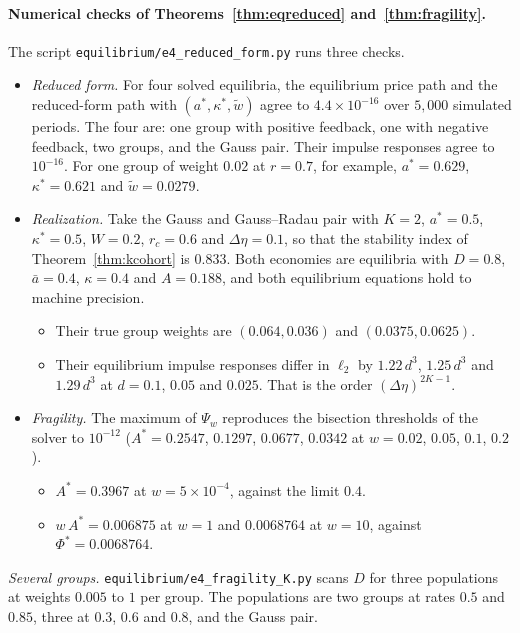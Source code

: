 \documentclass[12pt]{article}
\theoremstyle{definition}
\theoremstyle{remark}
\begin{document}
\paragraph{Numerical checks of Theorems~\ref{thm:eqreduced} and~\ref{thm:fragility}.} The script \nolinkurl{equilibrium/e4_reduced_form.py} runs three checks.
\begin{itemize}[itemsep=1pt,topsep=2pt]
\item \emph{Reduced form.} For four solved equilibria, the equilibrium price path and the reduced-form path with $(a^*,\kappa^*,\tilde w)$ agree to $4.4\times10^{-16}$ over $5{,}000$ simulated periods. The four are: one group with positive feedback, one with negative feedback, two groups, and the Gauss pair. Their impulse responses agree to $10^{-16}$. For one group of weight $0.02$ at $r=0.7$, for example, $a^*=0.629$, $\kappa^*=0.621$ and $\tilde w=0.0279$.
\item \emph{Realization.} Take the Gauss and Gauss--Radau pair with $K=2$, $a^*=0.5$, $\kappa^*=0.5$, $W=0.2$, $r_c=0.6$ and $\Delta\eta=0.1$, so that the stability index of Theorem~\ref{thm:kcohort} is $0.833$. Both economies are equilibria with $D=0.8$, $\bar a=0.4$, $\kappa=0.4$ and $A=0.188$, and both equilibrium equations hold to machine precision.
 \begin{itemize}[itemsep=1pt,topsep=2pt]
 \item Their true group weights are $(0.064,0.036)$ and $(0.0375,0.0625)$.
 \item Their equilibrium impulse responses differ in $\ell_2$ by $1.22\,d^3$, $1.25\,d^3$ and $1.29\,d^3$ at $d=0.1$, $0.05$ and $0.025$. That is the order $(\Delta\eta)^{2K-1}$.
 \end{itemize}
\item \emph{Fragility.} The maximum of $\Psi_w$ reproduces the bisection thresholds of the solver to $10^{-12}$ ($A^*=0.2547$, $0.1297$, $0.0677$, $0.0342$ at $w=0.02$, $0.05$, $0.1$, $0.2$).
 \begin{itemize}[itemsep=1pt,topsep=2pt]
 \item $A^*=0.3967$ at $w=5\times10^{-4}$, against the limit $0.4$.
 \item $w\,A^*=0.006875$ at $w=1$ and $0.0068764$ at $w=10$, against $\Phi^*=0.0068764$.
 \end{itemize}
\end{itemize}
\emph{Several groups.} \nolinkurl{equilibrium/e4_fragility_K.py} scans $D$ for three populations at weights $0.005$ to $1$ per group. The populations are two groups at rates $0.5$ and $0.85$, three at $0.3$, $0.6$ and $0.8$, and the Gauss pair.
\end{document}
